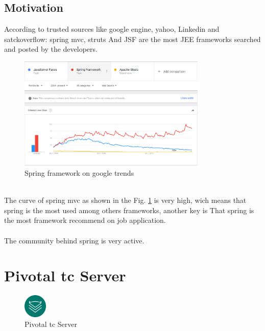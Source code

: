 \subsection{Motivation}
According to trusted sources like google engine, yahoo, Linkedin and satckoverflow: spring mvc, struts And JSF are the most JEE frameworks searched and posted by the developers.\\
\begin{figure}[!h]

	\centering
	\includegraphics[width=0.8\textwidth]{SpringMVC_statics_google_trends.png}
	\caption{Spring framework on google trends}
	\label{SpringMVC_statics_google_trends}
\end{figure}
\\
The curve of spring mvc as shown in the Fig. \ref{SpringMVC_statics_google_trends} is very high, wich means that spring is the most used among others frameworks, another key is That spring is the most framework recommend on job application.
\\
\\
The community behind spring is very active.

\section{Pivotal tc Server}

\begin{figure}[!h]
	
	\centering
	\includegraphics[width=0.1\textwidth]{icon_tcserver.png}
	\caption{Pivotal tc Server}
	\label{Pivotal tc Server}
\end{figure}

